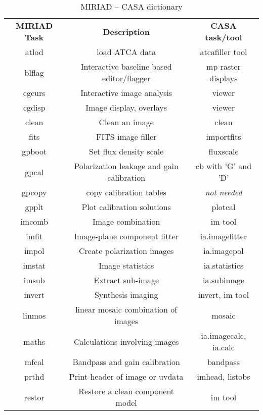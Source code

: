 \vspace{5mm}
\begin{table}[ht]
\caption[MIRIAD -- CASA dictionary]
        {\label{table:miriad}MIRIAD -- CASA dictionary}
\begin{center}
\begin{tabular}{|c|c|c|} \hline
{\bf MIRIAD Task} &  {\bf Description}     &  {\bf CASA task/tool}   \\
  atlod   &  load ATCA data                &  atcafiller tool \\
  blflag  &  Interactive baseline based editor/flagger  &  mp raster displays\\
  cgcurs  &  Interactive image analysis    &  viewer \\ 
  cgdisp  &  Image display, overlays       &  viewer  \\
  clean   &  Clean an image                &  clean   \\
  fits    &  FITS image filler             &  importfits \\  
  gpboot  &  Set flux density scale        &  fluxscale  \\
  gpcal   &  Polarization leakage and gain calibration  &  cb with 'G' and 'D'  \\
  gpcopy  &  copy calibration tables       &  {\it not needed} \\
  gpplt   &  Plot calibration solutions    &  plotcal  \\
  imcomb  &  Image combination             &  im tool   \\
  imfit   &  Image-plane component fitter  &  ia.imagefitter  \\
  impol   &  Create polarization images    &  ia.imagepol   \\
  imstat  &  Image statistics              &  ia.statistics  \\
  imsub   &  Extract sub-image             &  ia.subimage   \\
  invert  &  Synthesis imaging             &  invert, im tool  \\
  linmos  &  linear mosaic combination of images  &  mosaic  \\
  maths   &  Calculations involving images  &   ia.imagecalc, ia.calc \\ 
  mfcal   &  Bandpass and gain calibration  &  bandpass \\
  prthd   &  Print header of image or uvdata  &  imhead, listobs  \\
  restor  &  Restore a clean component model  &  im tool  \\

\end{tabular}
\end{center}
\end{table}
